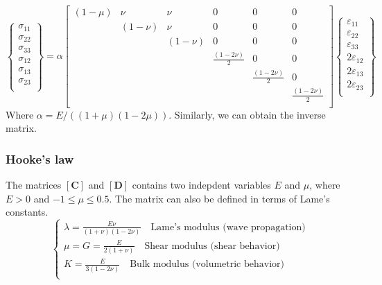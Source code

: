 \documentclass[notes]{beamer}
\begin{document}
\begin{frame}
\begin{equation*}
	\begin{Bmatrix}
		\sigma_{11}\\
		\sigma_{22}\\
		\sigma_{33}\\
		\sigma_{12}\\
		\sigma_{13}\\
		\sigma_{23}\\
	\end{Bmatrix} = \alpha
	\begin{bmatrix}
		(1-\mu) & \nu & \nu & 0 & 0 & 0 \\
	   			& (1-\nu) & \nu & 0 & 0 & 0 \\
	   			&  & (1-\nu) & 0 & 0 & 0 \\
	   			&  & & \frac{(1-2\nu)}{2} & 0 & 0 \\
	   			&  & & & \frac{(1-2\nu)}{2}  & 0 \\
	   			&  & & & & \frac{(1-2\nu)}{2} \\
	\end{bmatrix}
	\begin{Bmatrix}
		\varepsilon_{11}\\
		\varepsilon_{22}\\
		\varepsilon_{33}\\
		2\varepsilon_{12}\\
		2\varepsilon_{13}\\
		2\varepsilon_{23}\\
	\end{Bmatrix}
\end{equation*}
Where $\alpha = E / ((1+\mu)(1-2\mu))$.
Similarly, we can obtain the inverse matrix.
\end{frame}


\begin{frame}
\frametitle{Hooke's law}
The matrices $[\mathbf{C}]$ and $[\mathbf{D}]$ contains two indepdent variables $E$ and $\mu$, where $E > 0$ and $-1 \le \mu \le 0.5$. 
The matrix can also be defined in terms of Lame's constants.
\begin{equation*}
	\begin{cases}
		\lambda = \frac{E \nu}{(1+\nu)(1-2\nu)} \quad \text{Lame's modulus (wave propagation)}\\
		\mu = G = \frac{E}{2(1+\nu)}
		\quad \text{Shear modulus (shear behavior)}\\
		K = \frac{E}{3(1-2\nu)}
		\quad \text{Bulk modulus (volumetric behavior)}\\
	\end{cases}
\end{equation*}
\end{frame}
\end{document}
